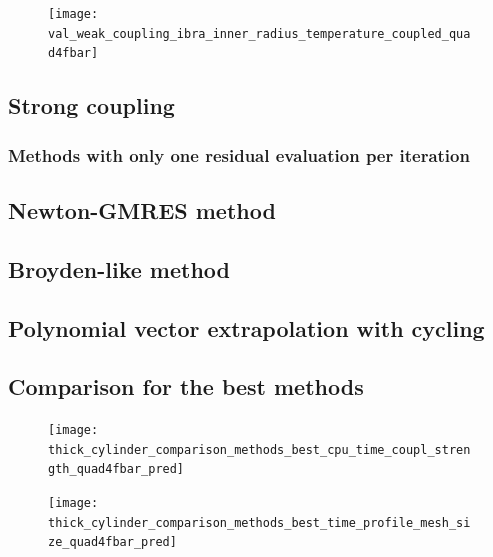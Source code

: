 \begin{figure}
\texttt{[image: val\_weak\_coupling\_ibra\_inner\_radius\_temperature\_coupled\_quad4fbar]}
\end{figure}


\subsection{Strong coupling}

\subsubsection{Methods with only one residual evaluation per iteration}

\subsection{Newton-GMRES method}

\subsection{Broyden-like method}

\subsection{Polynomial vector extrapolation with cycling}

\subsection{Comparison for the best methods}

\begin{figure}
\texttt{[image: thick\_cylinder\_comparison\_methods\_best\_cpu\_time\_coupl\_strength\_quad4fbar\_pred]}
\end{figure}

\begin{figure}
\texttt{[image: thick\_cylinder\_comparison\_methods\_best\_time\_profile\_mesh\_size\_quad4fbar\_pred]}
\end{figure}


